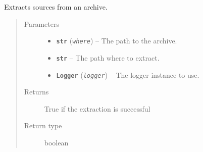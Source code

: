 \documentclass[a4paper,10pt,english]{sphinxmanual}
\begin{document}
\begin{fulllineitems}
\label{commands/apidoc/src:src.system.archive_extract}
Extracts sources from an archive.
\begin{quote}\begin{description}
\item[{Parameters}] \leavevmode\begin{itemize}
\item {} 
\textbf{\texttt{str}} (\emph{\texttt{where}}) -- The path to the archive.

\item {} 
\textbf{\texttt{str}} -- The path where to extract.

\item {} 
\textbf{\texttt{Logger}} (\emph{\texttt{logger}}) -- The logger instance to use.

\end{itemize}

\item[{Returns}] \leavevmode
True if the extraction is successful

\item[{Return type}] \leavevmode
boolean

\end{description}\end{quote}

\end{fulllineitems}

\end{document}
